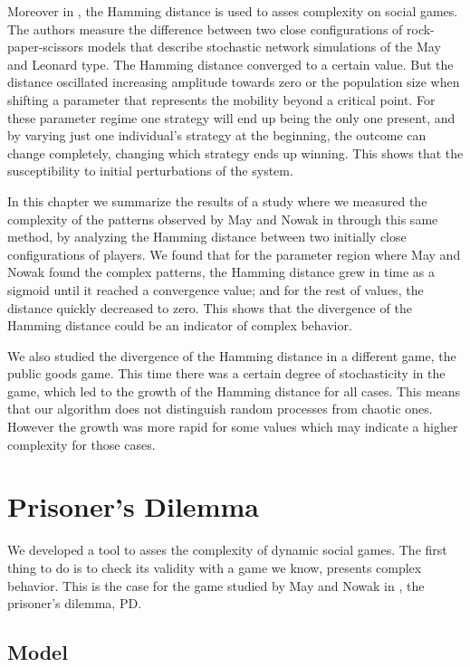 Moreover in \cite{HammingChaos1,HammingChaos2}, the Hamming distance is used to asses complexity on social games. The authors measure the difference between two close configurations of rock-paper-scissors models that describe stochastic network simulations of the May and Leonard type. The Hamming distance converged to a certain value. But the distance oscillated increasing amplitude towards zero or the population size when shifting a parameter that represents the mobility beyond a critical point. For these parameter regime one strategy will end up being the only one present, and by varying just one individual's strategy at the beginning, the outcome can change completely, changing which strategy ends up winning.  This shows that the susceptibility to  initial perturbations of the system. 

In this chapter we summarize the results of a study where we measured the complexity of the patterns observed by May and Nowak in \cite{SpatialChaos} through this same method, by analyzing the Hamming distance between two initially close configurations of players. We found that for the parameter region where May and Nowak found the complex patterns, the Hamming distance grew in time as a sigmoid until it reached a convergence value; and for the rest of values, the distance quickly decreased to zero. This shows that the divergence of the Hamming distance could be an indicator of complex behavior. 

We also studied the divergence of the Hamming distance in a different game, the public goods game. This time there was a certain degree of stochasticity in the game, which led to the growth of the Hamming distance for all cases. This means that our algorithm does not distinguish random processes from chaotic ones. However the growth was more rapid for some values which may indicate a higher complexity for those cases.


\section{Prisoner's Dilemma}

We developed a tool to asses the complexity of dynamic social games. The first thing to do is to check its validity with a game we know, presents complex behavior. This is the case for the game studied by May and Nowak in \cite{SpatialChaos}, the prisoner's dilemma, PD. 

\subsection{Model}

